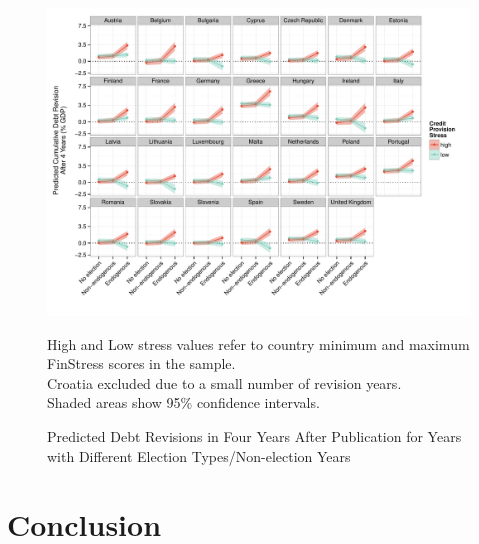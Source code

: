 \documentclass[]{article}
\begin{document}
\begin{figure}
	\caption{Predicted Debt Revisions in Four Years After Publication for Years with Different Election Types/Non-election Years}
    \label{country_predict_debt_required}
    \begin{center}
    	\includegraphics[scale=0.7]{figures/country_predict_required.pdf}
    \end{center}

	{\scriptsize{High and Low stress values refer to country minimum and maximum FinStress scores in the sample.\\
    Croatia excluded due to a small number of revision years.\\
    Shaded areas show 95\% confidence intervals.
}}

\end{figure}


\section{Conclusion}


\clearpage



\end{document}
